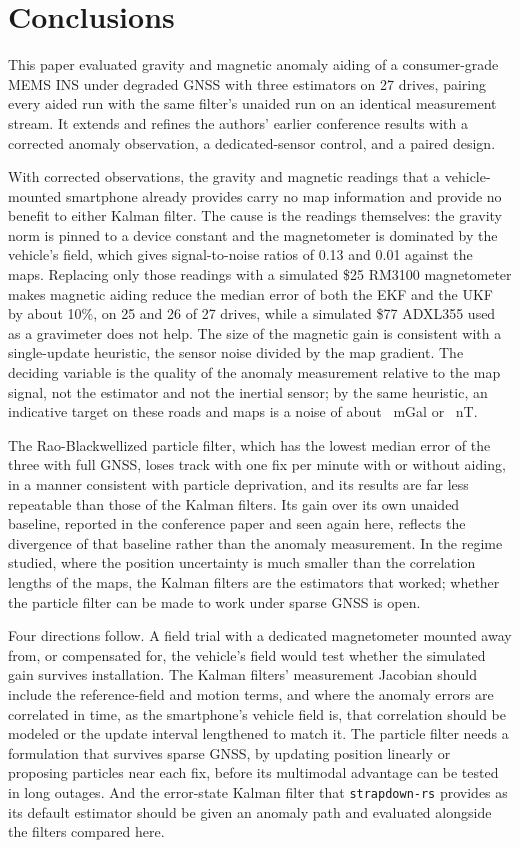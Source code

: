 \section{Conclusions}
\label{sec:conclusion}

This paper evaluated gravity and magnetic anomaly aiding of a consumer-grade MEMS INS under degraded GNSS with three estimators on 27 drives, pairing every aided run with the same filter's unaided run on an identical measurement stream. It extends and refines the authors' earlier conference results with a corrected anomaly observation, a dedicated-sensor control, and a paired design.

With corrected observations, the gravity and magnetic readings that a vehicle-mounted smartphone already provides carry no map information and provide no benefit to either Kalman filter. The cause is the readings themselves: the gravity norm is pinned to a device constant and the magnetometer is dominated by the vehicle's field, which gives signal-to-noise ratios of 0.13 and 0.01 against the maps. Replacing only those readings with a simulated \$25 RM3100 magnetometer makes magnetic aiding reduce the median error of both the EKF and the UKF by about 10\%, on 25 and 26 of 27 drives, while a simulated \$77 ADXL355 used as a gravimeter does not help. The size of the magnetic gain is consistent with a single-update heuristic, the sensor noise divided by the map gradient. The deciding variable is the quality of the anomaly measurement relative to the map signal, not the estimator and not the inertial sensor; by the same heuristic, an indicative target on these roads and maps is a noise of about \boundreqgrav~mGal or \boundreqmag~nT.

The Rao-Blackwellized particle filter, which has the lowest median error of the three with full GNSS, loses track with one fix per minute with or without aiding, in a manner consistent with particle deprivation, and its results are far less repeatable than those of the Kalman filters. Its gain over its own unaided baseline, reported in the conference paper and seen again here, reflects the divergence of that baseline rather than the anomaly measurement. In the regime studied, where the position uncertainty is much smaller than the correlation lengths of the maps, the Kalman filters are the estimators that worked; whether the particle filter can be made to work under sparse GNSS is open.

Four directions follow. A field trial with a dedicated magnetometer mounted away from, or compensated for, the vehicle's field would test whether the simulated gain survives installation. The Kalman filters' measurement Jacobian should include the reference-field and motion terms, and where the anomaly errors are correlated in time, as the smartphone's vehicle field is, that correlation should be modeled or the update interval lengthened to match it. The particle filter needs a formulation that survives sparse GNSS, by updating position linearly or proposing particles near each fix, before its multimodal advantage can be tested in long outages. And the error-state Kalman filter that \texttt{strapdown-rs} provides as its default estimator should be given an anomaly path and evaluated alongside the filters compared here.
